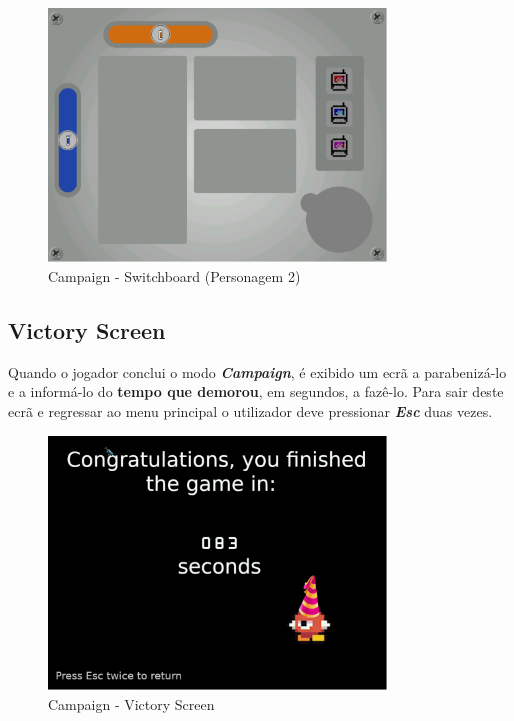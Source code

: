 \documentclass{report}
\begin{document}
\begin{figure}[H]
	\centering
	\includegraphics[width=0.8\textwidth]{campaign_switchboard}
	\caption{Campaign - Switchboard (Personagem 2)}
	\label{fig:switchboard}
\end{figure}

\pagebreak

\subsection{Victory Screen}

Quando o jogador conclui o modo \textbf{\textit{Campaign}}, é exibido um ecrã a parabenizá-lo e a informá-lo do \textbf{tempo que demorou}, em segundos, a fazê-lo.
Para sair deste ecrã e regressar ao menu principal o utilizador deve pressionar \textbf{\textit{Esc}} duas vezes.

\begin{figure}[H]
	\centering
	\includegraphics[width=0.8\textwidth]{win_screen}
	\caption{Campaign - Victory Screen}
\end{figure}
\end{document}
